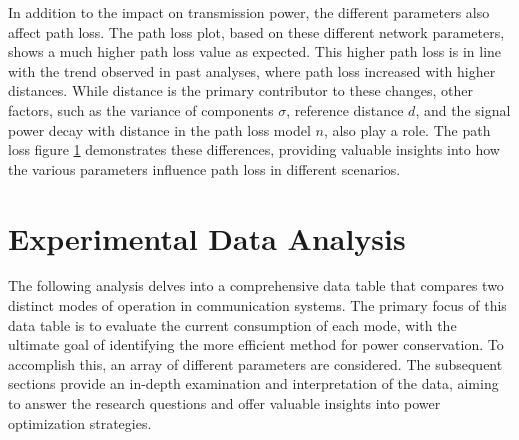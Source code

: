 \begin{figure}[H]
\begin{minipage}[t]{0.5\textwidth}
      \label{fig:path_loss_different_parameter}
  \end{minipage}
\end{figure}

In addition to the impact on transmission power, the different parameters also affect path loss. The path loss plot, based on these different network parameters, shows a much higher path loss value as expected. This higher path loss is in line with the trend observed in past analyses, where path loss increased with higher distances. While distance is the primary contributor to these changes, other factors, such as the variance of components $\sigma$, reference distance $d$, and the signal power decay with distance in the path loss model $n$, also play a role. The path loss figure \ref{fig:path_loss_different_parameter} demonstrates these differences, providing valuable insights into how the various parameters influence path loss in different scenarios.


\section{Experimental Data Analysis}

The following analysis delves into a comprehensive data table that compares two distinct modes of operation in communication systems. The primary focus of this data table is to evaluate the current consumption of each mode, with the ultimate goal of identifying the more efficient method for power conservation. To accomplish this, an array of different parameters are considered. The subsequent sections provide an in-depth examination and interpretation of the data, aiming to answer the research questions and offer valuable insights into power optimization strategies.


